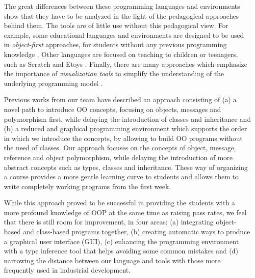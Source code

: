 The great differences between these programming languages and environments show that they have to be analyzed in the light of the pedagogical approaches behind them.
The tools are of little use without this pedagogical view.
For example, some educational languages and environments are designed to be used in \textit{object-first} approaches, 
\ie for students without any previous programming knowledge \cite{arnow_introduction_1998, bruce_library_2001}.
Other languages are focused on teaching to children or teenagers, such as Scratch \cite{malan_scratch_2007} and Etoys \cite{lee_empowering_2011}. 
Finally, there are many approaches which emphasize the importance of \emph{visualization tools} 
to simplify the understanding of the underlying programming model \cite{cooper_teaching_2003, roberts_designing_1998}.

\medskip

Previous works from our team \cite{lombardi_instances_2007,lombardi_carlos_alumnos_2008,griggio_programming_2011,spigariol_lucas_ensenando_2013} have described an approach consisting of
(a) a novel path to introduce OO concepts, focusing on objects, messages and polymorphism first, while delaying the introduction of classes and inheritance and 
(b) a reduced and graphical programming environment which supports the order in which we introduce the concepts, by allowing to build OO programs without the need of classes.
Our approach focuses on the concepts of object, message, reference and object polymorphism, while delaying the introduction of more abstract concepts such as types, classes and inheritance.
These way of organizing a course provides a more gentle learning curve to students and allows them to write completely working programs from the first week.

While this approach proved to be successful in providing the students with a more profound knowledge of OOP at the same time as raising pass rates, 
we feel that there is still room for improvement, in four areas:
(a) integrating object-based and class-based programs together,
(b) creating automatic ways to produce a graphical user interface (GUI),
(c) enhancing the programming environment with a type inference tool that helps avoiding some common mistakes
and (d) narrowing the distance between our language and tools with those more frequently used in industrial development.


\medskip 

